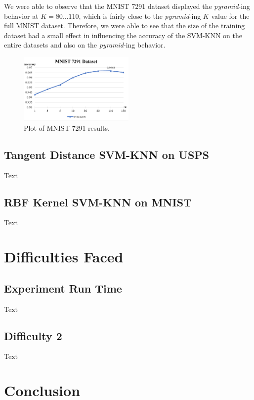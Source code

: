 \documentclass[11pt,letterpaper]{article}
\begin{document}
We were able to observe that the MNIST 7291 dataset displayed the \textit{pyramid}-ing behavior at $K=80\dots 110$, which is fairly close to the \textit{pyramid}-ing $K$ value for the full MNIST dataset. Therefore, we were able to see that the size of the training dataset had a small effect in influencing the accuracy of the SVM-KNN on the entire datasets and also on the \textit{pyramid}-ing behavior.

\begin{figure}[t!]
  \centering
  \includegraphics[keepaspectratio, width=0.5\textwidth]{mnist_7291.png}
  \caption{Plot of MNIST 7291 results.}
\end{figure}


\subsection{Tangent Distance SVM-KNN on USPS}

Text

\subsection{RBF Kernel SVM-KNN on MNIST}

Text

\section{Difficulties Faced}

\subsection{Experiment Run Time}

Text

\subsection{Difficulty 2}

Text

\section{Conclusion}
\end{document}
